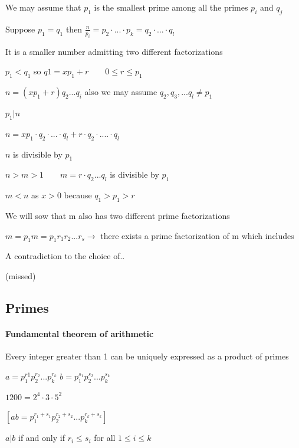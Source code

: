 \documentclass[9pt, letterpaper, oneside]{article}
\begin{document}
We may assume that $p_1$ is the smallest prime among all the primes $p_i$ and $q_j$

Suppose $p_1 = q_1$ then $\displaystyle\frac{n}{p_i} = p_2 \cdot ... \cdot p_k = q_2 \cdot ... \cdot q_l$

It is a smaller number admitting two different factorizations

$p_1 < q_1$ so $q1 = xp_1 + r \qquad 0 \leq r \leq p_1$

$n = (xp_1 + r )q_2 ... q_i$ also we may assume $q_2, q_3 , ... q_l \neq p_1$

$p_1 | n$ 

$n = xp_1\cdot q_2 \cdot ... \cdot q_l + r \cdot q_2 \cdot .... \cdot q_l$

$n$ is divisible by $p_1$

$n > m > 1 \qquad m = r \cdot q_2...q_l$ is divisible by $p_1$

$m < n$ as $x > 0$ because $q_1 > p_1 > r$

We will sow that m also has two different prime factorizations 

$m = p_1m = p_1r_1r_2...r_s \to$ there exists a prime factorization of m which includes 

A contradiction to the choice of..

(missed)



\subsection{Primes}

\paragraph{Fundamental theorem of arithmetic} Every integer greater than 1 can be uniquely expressed as a product of primes

$a=p_1^{r1}p_2^{r_2}...p_k^{r_k}$
$b = p_1^{s_1}p_2^{s_2}...p_k^{s_k}$

$1200 = 2^4\cdot 3 \cdot 5^2$

$[ab = p_1^{r_1 + s_1} p_2^{r_2 + s_2} ... p_k^{r_k + s_k}]$

$a | b$ if and only if $r_i \leq s_i$ for all $1 \leq i \leq k$
\end{document}

